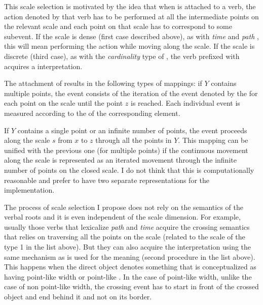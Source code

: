 This scale selection is motivated by the idea that when  is attached to a verb, the action denoted by that verb has to be performed at all the intermediate points on the relevant scale and each point on that scale has to correspond to some subevent. If the scale is dense (first case described above), as with \textit{time} and \textit{path} , this will mean performing the action while moving along the scale. If the scale is discrete (third case), as with the \textit{cardinality} type of , the verb prefixed with  acquires a  interpretation. 

The attachment of  results in the following types of mappings: %
if $Y$ contains multiple points, the event consists of the iteration of the event denoted by the  for each point on the scale until the point $z$ is reached. Each individual event is measured according to the  of the corresponding element.

If $Y$ contains a single point or an infinite number of points, the event proceeds along the scale $s$ from $x$ to $z$ through all the points in $Y$. This mapping can be unified with the previous one (for multiple points) if the continuous movement along the scale is represented as an iterated movement through the infinite number of points on the closed scale. I do not think that this is computationally reasonable and prefer to have two separate representations for the implementation.

The process of scale selection I propose does not rely on the semantics of the verbal roots and it is even independent of the scale dimension. For example, usually those verbs that lexicalize \textit{path} and \textit{time}  acquire the crossing semantics that relies on traversing all the points on the scale (related to the scale of the type 1 in the list above). But they can also acquire the interpretation using the same mechanism as is used for the  meaning (second procedure in the list above). This happens when the direct object denotes something that is conceptualized as having point-like width or point-like . In the case of point-like width, unlike the case of non point-like width, the crossing event has to start in front of the crossed object and end behind it and not on its border.


